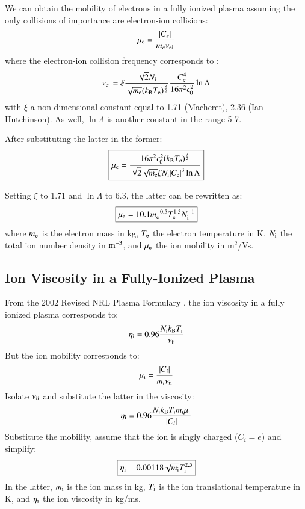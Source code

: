 \documentclass{warpdoc}
\newcommand{\mfd}{\displaystyle}
\newcommand\frameeqn[1]{\fbox{$\displaystyle #1$}}
\begin{document}
We can obtain the mobility of electrons in a fully ionized plasma assuming the only collisions of importance are electron-ion collisions:
%
\begin{equation}
 \mu_{\rm e} = \frac{|C_e|}{m_e \nu_{\rm ei}}
\end{equation}
% 
where the electron-ion collision frequency corresponds to \cite{book:1984:chen}:
%
\begin{equation}
\nu_{\rm ei}=\xi \frac{ \sqrt{2} N_{\rm i}}{ \sqrt{m_{\rm e}} (k_{\rm B} T_{\rm e})^\frac{3}{2}}  \frac{C_{\rm e}^4}{16 \pi^2 \epsilon_0^2}  \ln \Lambda
\end{equation}
%
with $\xi$ a non-dimensional constant equal to 1.71 (Macheret), 2.36 (Ian Hutchinson). As well, $\ln \Lambda$ is another constant in the range 5-7.


After substituting the latter in the former:
%
\begin{equation}
\frameeqn{
 \mu_{\rm e} = \frac{16 \pi^2 \epsilon_0^2 (k_{\rm B} T_{\rm e})^\frac{3}{2}}{\mfd \sqrt{2}\sqrt{m_{\rm e}} \xi  N_{\rm i}  |C_{\rm e}|^3  \ln \Lambda}
}
\end{equation}
% 

Setting $\xi$ to 1.71 and $\ln \Lambda$ to 6.3, the latter can be rewritten as:
%
\begin{equation}
\frameeqn{
 \mu_{\rm e} = 10.1 m_{\rm e}^{-0.5} T_{\rm e}^{1.5} N_{\rm i}^{-1}
}
\end{equation}
% 
where $m_{\rm e}$ is the electron mass in kg, $T_{\rm e}$ the electron  temperature in K, $N_{\rm i}$ the total ion number density in $\rm m^{-3}$, and $\mu_{\rm e}$ the ion mobility in m$^2$/Vs.



\subsection{Ion Viscosity in a Fully-Ionized Plasma}

From the 2002 Revised NRL Plasma Formulary \cite{nrl:2002:huba}, the ion viscosity in a fully ionized plasma corresponds to:
%
\begin{equation}
\eta_{\rm i}= 0.96    \frac{N_{\rm i} k_{\rm B} T_{\rm i} }{\nu_{\rm ii}}
\end{equation}
%
But the ion mobility corresponds to:
%
\begin{equation}
 \mu_{\rm i} = \frac{|C_i|}{m_i \nu_{\rm ii}}
\end{equation}
%
Isolate $\nu_{\rm ii}$ and substitute the latter in the viscosity:
%
\begin{equation}
\eta_{\rm i}=  0.96  \frac{N_{\rm i} k_{\rm B} T_{\rm i} m_{\rm i} \mu_{\rm i}}{|C_i|}
\end{equation}
%
Substitute the mobility, assume that the ion is singly charged ($C_i=e$) and simplify:
%
\begin{equation}
\frameeqn{
\eta_{\rm i}=   0.00118  \sqrt{m_{\rm i}}   T_{\rm i}^{2.5}  
}
\end{equation}
%
In the latter, $m_{\rm i}$ is the ion mass in kg, $T_{\rm i}$ is the ion translational temperature in K, and $\eta_{\rm i}$ the ion viscosity in kg/ms. 
\end{document}
